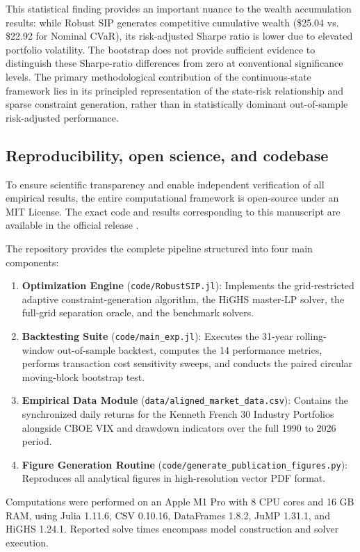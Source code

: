 \documentclass[smallextended]{svjour3}
\begin{document}
This statistical finding provides an important nuance to the wealth accumulation results: while Robust SIP generates competitive cumulative wealth (\$25.04 vs. \$22.92 for Nominal CVaR), its risk-adjusted Sharpe ratio is lower due to elevated portfolio volatility. The bootstrap does not provide sufficient evidence to distinguish these Sharpe-ratio differences from zero at conventional significance levels. The primary methodological contribution of the continuous-state framework lies in its principled representation of the state-risk relationship and sparse constraint generation, rather than in statistically dominant out-of-sample risk-adjusted performance.

\subsection{Reproducibility, open science, and codebase}
To ensure scientific transparency and enable independent verification of all empirical results, the entire computational framework is open-source under an MIT License. The exact code and results corresponding to this manuscript are available in the official release \cite{bezoui2026robust}.

The repository provides the complete pipeline structured into four main components:
\begin{enumerate}
    \item \textbf{Optimization Engine} (\texttt{code/RobustSIP.jl}): Implements the grid-restricted adaptive constraint-generation algorithm, the HiGHS master-LP solver, the full-grid separation oracle, and the benchmark solvers.
    \item \textbf{Backtesting Suite} (\texttt{code/main\_exp.jl}): Executes the 31-year rolling-window out-of-sample backtest, computes the 14 performance metrics, performs transaction cost sensitivity sweeps, and conducts the paired circular moving-block bootstrap test.
    \item \textbf{Empirical Data Module} (\texttt{data/aligned\_market\_data.csv}): Contains the synchronized daily returns for the Kenneth French 30 Industry Portfolios \cite{french2026data} alongside CBOE VIX and drawdown indicators over the full 1990 to 2026 period.
    \item \textbf{Figure Generation Routine} (\texttt{code/generate\_publication\_figures.py}): Reproduces all analytical figures in high-resolution vector PDF format.
\end{enumerate}

Computations were performed on an Apple M1 Pro with 8 CPU cores and 16 GB RAM, using Julia 1.11.6, CSV 0.10.16, DataFrames 1.8.2, JuMP 1.31.1, and HiGHS 1.24.1. Reported solve times encompass model construction and solver execution.
\end{document}

